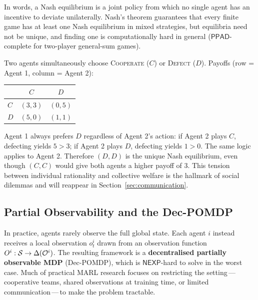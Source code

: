In words, a Nash equilibrium is a joint policy from which no single
agent has an incentive to deviate unilaterally. Nash's theorem
guarantees that every finite game has at least one Nash equilibrium
in mixed strategies, but equilibria need not be unique, and finding
one is computationally hard in general ($\mathsf{PPAD}$-complete for
two-player general-sum games).

\begin{example}
\label{ex:prisoners}
Two agents simultaneously choose \textsc{Cooperate} ($C$) or
\textsc{Defect} ($D$). Payoffs (row = Agent 1, column = Agent 2):
\begin{center}
\small
\begin{tabular}{@{}lcc@{}}
\toprule
 & $C$ & $D$ \\
\midrule
$C$ & $(3,3)$ & $(0,5)$ \\
$D$ & $(5,0)$ & $(1,1)$ \\
\bottomrule
\end{tabular}
\end{center}
Agent 1 always prefers $D$ regardless of Agent 2's action: if Agent 2
plays $C$, defecting yields $5 > 3$; if Agent 2 plays $D$, defecting
yields $1 > 0$. The same logic applies to Agent 2. Therefore $(D, D)$
is the unique Nash equilibrium, even though $(C, C)$ would give both
agents a higher payoff of $3$. This tension between individual
rationality and collective welfare is the hallmark of social
dilemmas and will reappear in
Section~\ref{sec:communication}.
\end{example}

\subsection{Partial Observability and the Dec-POMDP}

In practice, agents rarely observe the full global state. Each agent
$i$ instead receives a local observation $o^i_t$ drawn from an
observation function $O^i : \mathcal{S} \to \Delta(\mathcal{O}^i)$. The
resulting framework is a \textbf{decentralised partially observable
MDP} (Dec-POMDP), which is $\mathsf{NEXP}$-hard to
solve in the worst case. Much of practical MARL research focuses on
restricting the setting\,---\,cooperative teams, shared observations
at training time, or limited communication\,---\,to make the problem
tractable.

